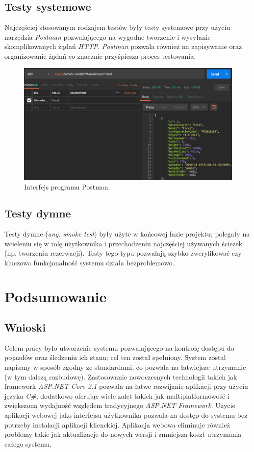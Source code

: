 \documentclass[eng,printmode,openany]{mgr}
\begin{document}
	\section{Testy systemowe}
	Najczęściej stosowanym rodzajem testów były testy systemowe przy użyciu narzędzia \textit{Postman} pozwalającego na wygodne tworzenie i wysyłanie skomplikowanych żądań \textit{HTTP}. \textit{Postman} pozwala również na zapisywanie oraz organizowanie żądań co znacznie przyśpiesza proces testowania.
	\begin{figure}[H]
		\centering
		\includegraphics[width=\textwidth]{images/tests_postman.png}
		\caption{Interfejs programu Postman.}
	\end{figure}
	\section{Testy dymne}
	Testy dymne (\textit{ang. smoke test}) były użyte w końcowej fazie projektu; polegały na wcieleniu się w rolę użytkownika i przechodzeniu najczęściej używanych ścieżek (np. tworzeniu rezerwacji). Testy tego typu pozwalają szybko zweryfikować czy kluczowa funkcjonalność systemu działa bezproblemowo.
	
	\newpage
	\chapter{Podsumowanie}
	\section{Wnioski}
	Celem pracy było utworzenie systemu pozwalającego na kontrolę dostępu do pojazdów oraz śledzeniu ich stanu; cel ten został spełniony. System został napisany w sposób zgodny ze standardami, co pozwala na łatwiejsze utrzymanie (w tym dalszą rozbudowę). Zastosowanie nowoczesnych technologii takich jak framework \textit{ASP.NET Core 2.1} pozwala na łatwe rozwijanie aplikacji przy użyciu języka \textit{C\#}, dodatkowo oferując wiele zalet takich jak multiplatformowość i zwiększoną wydajność względem tradycyjnego \textit{ASP.NET Framework}. Użycie aplikacji webowej jako interfejsu użytkownika pozwala na dostęp do systemu bez potrzeby instalacji aplikacji klienckiej. Aplikacja webowa eliminuje również problemy takie jak aktualizacje do nowych wersji i zmniejsza koszt utrzymania całego systemu.
	
\end{document}
